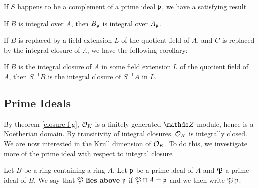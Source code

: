 			If $S$ happens to be a complement of a prime ideal $\mathfrak{p}$, we have a satisfying result
			
			\begin{corollary}\label{int-loc}
				If $B$ is integral over $A$, then $B_\mathfrak{p}$ is integral over $A_\mathfrak{p}$.
			\end{corollary}
			
			If $B$ is replaced by a field extension $L$ of the quotient field of $A$, and $C$ is replaced by the integral closure of $A$, we have the following corollary:
			
			\begin{corollary}
				If $B$ is the integral closure of $A$ in some field extension $L$ of the quotient field of $A$, then $S^{-1}B$ is the integral closure of $S^{-1}A$ in $L$.
			\end{corollary}
			
		\subsection{Prime Ideals}
			By theorem \ref{closure-f-g}, $\mathcal{O}_K$ is a finitely-generated $\Z$-module, hence is a Noetherian domain. By transitivity of integral closures, $\mathcal{O}_K$ is integrally closed. We are now interested in the Krull dimension of $\mathcal{O}_K$. To do this, we investigate more of the prime ideal with respect to integral closure. 
			\begin{definition}
				Let $B$ be a ring containing a ring $A$. Let $\mathfrak{p}$ be a prime ideal of $A$ and $\mathfrak{P}$ a prime ideal of $B$. We say that $\mathfrak{P}$ \textbf{lies above} $\mathfrak{p}$ if $\mathfrak{P} \cap A = \mathfrak{p}$ and we then write $\mathfrak{P}|\mathfrak{p}$.
			\end{definition}
			
